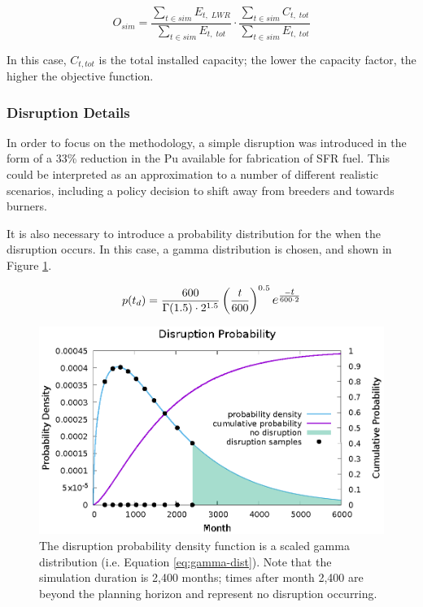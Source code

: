 \begin{equation}
    O_{sim} = \frac{\sum\limits_{t \in sim} E_{t,\;LWR}}{\sum\limits_{t \in sim} E_{t,\;tot}}
              \cdot
              \frac{\sum\limits_{t \in sim} C_{t,\;tot}}{\sum\limits_{t \in sim} E_{t,\;tot}}
    \label{eq:exp3-obj}
\end{equation}

In this case, $C_{t,tot}$ is the total installed capacity; the lower the capacity factor, the higher the objective function.

\subsubsection{Disruption Details}

In order to focus on the methodology, a simple disruption was introduced in
the form of a 33\% reduction in the Pu available for fabrication of \gls{SFR}
fuel.  This could be interpreted as an approximation to a number of different
realistic scenarios, including a policy decision to shift away from breeders
and towards burners.

It is also necessary to introduce a probability distribution for the when the
disruption occurs.  In this case, a gamma distribution is chosen, and shown in
Figure \ref{fig:exp3-gamma-dist}.

\begin{equation}
    p(t_d) = \frac{600}{\Gamma(1.5)\cdot 2^{1.5}} \left(\frac{t}{600}\right)^{0.5} \mathlarger{e^{\frac{\mathlarger{\mathsmaller{-}t}}{600 \cdot 2}}}
    \label{eq:gamma-dist}
\end{equation}

\begin{figure}[!htb]
    \centering
    \includegraphics[width=1.0\columnwidth]{gamma-dist.eps}
    \caption[Disruption Probability Distribution]{
        The disruption probability density function is a scaled gamma
        distribution (i.e. Equation \ref{eq:gamma-dist}).  Note that the
        simulation duration is 2,400 months; times after month 2,400 are
        beyond the planning horizon and represent no disruption occurring.
    }
    \label{fig:exp3-gamma-dist}
\end{figure}


